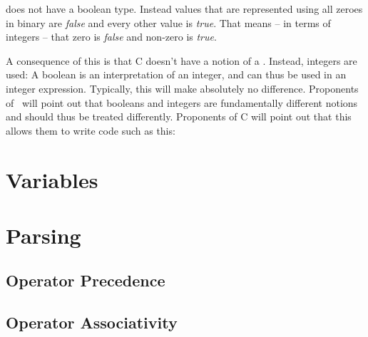  does not have a boolean type. Instead  values that are represented using all zeroes in binary are \textsl{false} and every other value is \textsl{true}. That means -- in terms of integers -- that zero is \textsl{false} and non-zero is \textsl{true}. %

A consequence of this is that C doesn't have a notion of a . Instead, integers are used: A boolean is an interpretation of an integer, and can thus be used in an integer expression. Typically, this will make absolutely no difference. Proponents of \csharp\ will point out that booleans and integers are fundamentally different notions and should thus be treated differently. Proponents of C will point out that this allows them to write code such as this:



\section{Variables}
\csharpsubsection{\csharp}

\section{Parsing}
\subsection{Operator Precedence}
\subsection{Operator Associativity}


